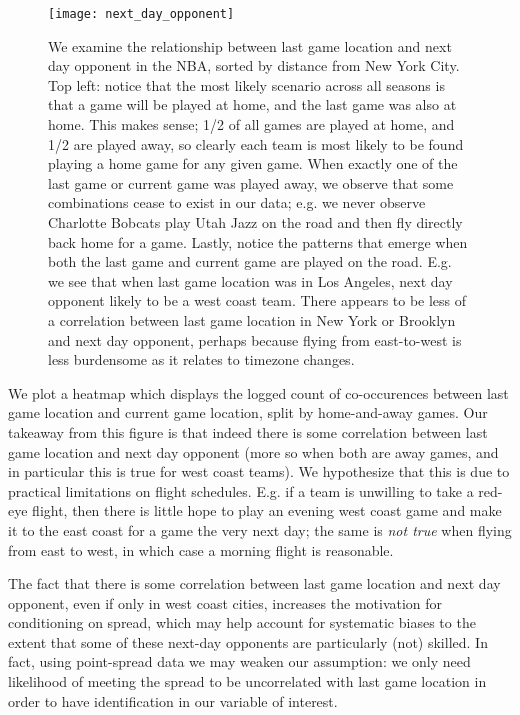 \documentclass[letterpaper,12pt]{article}
\begin{document}
\begin{figure}
  \centering
  \label{fig: next day opponent}
  \texttt{[image: next\_day\_opponent]}
  \caption{We examine the relationship between last game location and next day opponent in the NBA, sorted by distance from New York City. 
Top left: notice that the most likely scenario across all seasons is that a game will be played at home, and the last game was also at home. This makes sense; 1/2 of all games are played at home, and 1/2 are played away, so clearly each team is most likely to be found playing a home game for any given game. When exactly one of the last game or current game was played away,
we observe that some combinations cease to exist in our data; e.g. we never observe Charlotte Bobcats play Utah Jazz on the road and then fly directly back home for a game. Lastly, notice the patterns that emerge when both the last game and current game are played on the road. E.g. we see that when last game location was in Los Angeles, next day opponent likely to be a west coast team. There appears to be less of a correlation between last game location in New York or Brooklyn and next day opponent, perhaps because flying from east-to-west
is less burdensome as it relates to timezone changes.} 
\end{figure}

We plot a heatmap which displays the logged count of co-occurences between last game
location and current game location, split by home-and-away games.
Our takeaway from this figure is that indeed there is some correlation between last game location
and next day opponent (more so when both are away games,  
and in particular this is true for west coast teams). We hypothesize that
this is due to practical limitations on flight schedules. E.g. if a team is unwilling to take a red-eye
flight, then there is little hope to play an evening west coast game and make it to the east coast for a game the very next day;
the same is \emph{not true} when flying from east to west, in which case a morning flight is reasonable.


The fact that there is some correlation between last game location and next day opponent, even if only in west coast cities, increases the motivation for conditioning on spread, which may help account for systematic biases to the extent that some of these next-day opponents are particularly (not) skilled. 
In fact, using point-spread data we may weaken our assumption: we only need
likelihood of meeting the spread to be uncorrelated with last game location
in order to have identification in our variable of interest.
\end{document}
